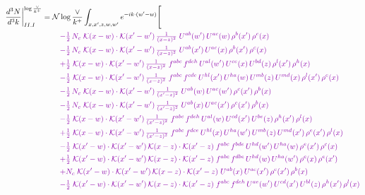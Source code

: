 \documentclass[10pt]{article}
\numberwithin{equation}{section}
\newcommand{\NNv}{\mathcal N\log\frac{\vee}{k^+}}
\begin{document}
\begin{align}
\frac{d^3N}{d^3k}\bigg|^{\log\frac{\vee}{k^+}}_{II.I}={}&\NNv\int_{x,x',z,w,w'}e^{-ik\cdot(w'-w)}\Bigg[\notag\\
&\quad{\color{CC}-\tfrac{1}{2}\,N_c\;\mathcal{K}(x-w)\cdot\mathcal{K}(x'-w')\,\tfrac{1}{(x-z)^{2}}\;U^{ab}(w')\,U^{ac}(w)\,\rho^{b}(x')\,\rho^{c}(x)}\notag\\
&\quad{\color{CC}-\tfrac{1}{2}\,N_c\;\mathcal{K}(x-w)\cdot\mathcal{K}(x'-w')\,\tfrac{1}{(x-z)^{2}}\;U^{ab}(x')\,U^{ac}(x)\,\rho^{b}(x')\,\rho^{c}(x)}\notag\\
&\quad{\color{CC}+\tfrac{1}{2}\;\mathcal{K}(x-w)\cdot\mathcal{K}(x'-w')\,\tfrac{1}{(x-z)^{2}}\;f^{abc}\,f^{deh}\,U^{al}(w')\,U^{ce}(x)\,U^{bd}(z)\,\rho^{l}(x')\,\rho^{h}(x)}\notag\\
&\quad{\color{CC}-\tfrac{1}{2}\;\mathcal{K}(x-w)\cdot\mathcal{K}(x'-w')\,\tfrac{1}{(x-z)^{2}}\;f^{abc}\,f^{cde}\,U^{hl}(x')\,U^{ha}(w)\,U^{mb}(z)\,U^{md}(x)\,\rho^{l}(x')\,\rho^{e}(x)}\notag\\
&\quad{\color{CC}-\tfrac{1}{2}\,N_c\;\mathcal{K}(x-w)\cdot\mathcal{K}(x'-w')\,\tfrac{1}{(x'-z)^{2}}\;U^{ab}(w)\,U^{ac}(w')\,\rho^{c}(x')\,\rho^{b}(x)}\notag\\
&\quad{\color{CC}-\tfrac{1}{2}\,N_c\;\mathcal{K}(x-w)\cdot\mathcal{K}(x'-w')\,\tfrac{1}{(x'-z)^{2}}\;U^{ab}(x)\,U^{ac}(x')\,\rho^{c}(x')\,\rho^{b}(x)}\notag\\
&\quad{\color{CC}-\tfrac{1}{2}\;\mathcal{K}(x-w)\cdot\mathcal{K}(x'-w')\,\tfrac{1}{(x'-z)^{2}}\;f^{abc}\,f^{deh}\,U^{al}(w)\,U^{cd}(x')\,U^{be}(z)\,\rho^{h}(x')\,\rho^{l}(x)}\notag\\
&\quad{\color{CC}+\tfrac{1}{2}\;\mathcal{K}(x-w)\cdot\mathcal{K}(x'-w')\,\tfrac{1}{(x'-z)^{2}}\;f^{abc}\,f^{dce}\,U^{hl}(x)\,U^{ha}(w')\,U^{mb}(z)\,U^{md}(x')\,\rho^{e}(x')\,\rho^{l}(x)}\notag\\
&\quad{\color{CC}-\tfrac{1}{2}\;\mathcal{K}(x'-w)\cdot\mathcal{K}(x'-w')\,\mathcal{K}(x-z)\cdot\mathcal{K}(x'-z)\;f^{abc}\,f^{bde}\,U^{hd}(w')\,U^{ha}(w)\,\rho^{e}(x')\,\rho^{c}(x)}\notag\\
&\quad{\color{CC}+\tfrac{1}{2}\;\mathcal{K}(x'-w)\cdot\mathcal{K}(x'-w')\,\mathcal{K}(x-z)\cdot\mathcal{K}(x'-z)\;f^{abc}\,f^{dbe}\,U^{hd}(w)\,U^{ha}(w')\,\rho^{c}(x)\,\rho^{e}(x')}\notag\\
&\quad{\color{CC}+N_c\;\mathcal{K}(x'-w)\cdot\mathcal{K}(x'-w')\,\mathcal{K}(x-z)\cdot\mathcal{K}(x'-z)\;U^{ab}(x)\,U^{ac}(x')\,\rho^{c}(x')\,\rho^{b}(x)}\notag\\
&\quad{\color{CC}-\tfrac{1}{2}\;\mathcal{K}(x'-w)\cdot\mathcal{K}(x'-w')\,\mathcal{K}(x-z)\cdot\mathcal{K}(x'-z)\;f^{abc}\,f^{deh}\,U^{ae}(w')\,U^{cd}(x')\,U^{bl}(z)\,\rho^{h}(x')\,\rho^{l}(x)}\notag\\

\end{align}
\end{document}
